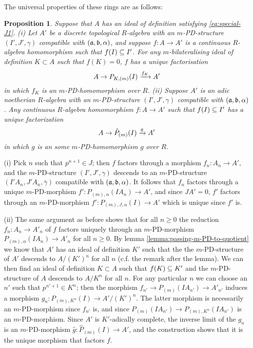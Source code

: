 \documentclass{article}
\theoremstyle{change}
\newtheorem{prop}[subsubsection]{Proposition}
\numberwithin{equation}{subsubsection}
\newcommand{\demobox}{\vrule height6pt width6pt depth0pt}
\newenvironment{demo}{\noindent{\it Proof.}}
{{\unskip\nobreak\hfil\qquad
\demobox\parfillskip=0pt\par}
\medskip}
\begin{document}
The universal properties of these rings are as follows:

\begin{prop}
  Suppose that $A$ has an ideal of definition satisfying
  \ref{eq:special-J1}. (i) Let $A'$ be a \textit{discrete} topological
  $R$-algebra with an $m$-PD-structure $(I',J',\gamma)$ compatible
  with $({\mathfrak a},{\mathfrak b},\alpha)$, and suppose $f:A\to A'$ is a continuous
  $R$-algebra homomorphism such that $f(I)\subseteq I'$. For any
  $m$-bilateralising ideal of definition $K\subset A$ such that
  $f(K)=0$, $f$ has a unique factorisation
  \begin{displaymath}
    A\to P_{K,(m)}(I)\xrightarrow{f_K}A'
  \end{displaymath}
  in which $f_K$ is an $m$-PD-homomorphism over $R$.  (ii) Suppose
  $A'$ is an adic noetherian $R$-algebra with an $m$-PD-structure
  $(I',J',\gamma)$ compatible with $({\mathfrak a},{\mathfrak b},\alpha)$. Any continuous
  $R$-algebra homomorphism $f:A\to A'$ such that $f(I)\subseteq I'$ has a
  unique factorization
  \begin{displaymath}
    A\to\hat P_{(m)}(I)\xrightarrow{g}A'
  \end{displaymath}
  in which $g$ is an some $m$-PD-homomorphism $g$ over $R$.
\end{prop}
\begin{demo}
  (i) Pick $n$ such that $p^{n+1}\in J$; then $f$ factors through a
  morphism $f_n:A_n\to A'$, and the $m$-PD-structure $(I',J',\gamma)$
  descends to an $m$-PD-structure $(I'A_n,J'A_n,\bar\gamma)$
  compatible with $({\mathfrak a},{\mathfrak b},\alpha)$. It follows that $f_n$ factors
  through a unique $m$-PD-morphism $f':P_{(m),\alpha}(IA_n)\to A'$,
  and since $JA'=0$, $f'$ factors through an $m$-PD-morphism
  $f':P_{(m),J,\alpha}(I)\to A'$ which is unique since $f'$ is.

  (ii) The same argument as before shows that for all $n\ge0$ the
  reduction $f_n:A_n\to A'_n$ of $f$ factors uniquely through an
  $m$-PD-morphism $P_{(m),\alpha}(IA_n)\to A'_n$ for all $n\ge0$. By
  lemma \ref{lemma:passing-m-PD-to-quotient} we know that $A'$ has an
  ideal of definition $K'$ such that the the $m$-PD-structure of $A'$
  descends to $A/(K')^n$ for all $n$ (c.f. the remark after the
  lemma). We can then find an ideal of definition $K\subset A$ such
  that $f(K)\subseteq K'$ and the $m$-PD-structure of $A$ descends to
  $A/K^n$ for all $n$. For any particular $n$ we can choose an $n'$
  such that $p^{n'+1}\in K^n$; then the morphism
  $f_{n'}\to P_{(m)}(IA_{n'})\to A'_{n'}$ induces a morphism
  $g_n:P_{(m),K^n}(I)\to A'/(K')^n$. The latter morphism is
  necessarily an $m$-PD-morphism since $f_{n'}$ is, and since
  $P_{(m)}(IA_{n'})\to P_{(m),K^n}(IA_{n'})$ is an
  $m$-PD-morphism. Since $A'$ is $K'$-adically complete, the inverse
  limit of the $g_n$ is an $m$-PD-morphism
  $\hat g:\hat P_{(m)}(I)\to A'$, and the construction shows that it
  is the unique morphism that factors $f$.
\end{demo}
\end{document}
